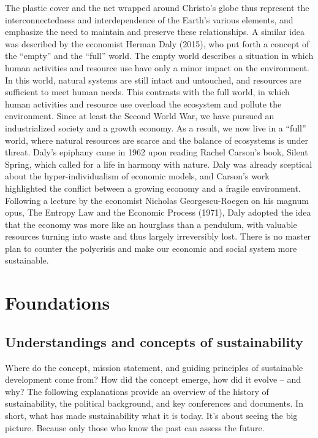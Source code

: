 \documentclass[
  a4paper,
  openany]{book}
\begin{document}
The plastic cover and the net wrapped around Christo's globe thus
represent the interconnectedness and interdependence of the Earth's
various elements, and emphasize the need to maintain and preserve these
relationships. A similar idea was described by the economist Herman Daly
(2015), who put forth a concept of the ``empty'' and the ``full'' world.
The empty world describes a situation in which human activities and
resource use have only a minor impact on the environment. In this world,
natural systems are still intact and untouched, and resources are
sufficient to meet human needs. This contrasts with the full world, in
which human activities and resource use overload the ecosystem and
pollute the environment. Since at least the Second World War, we have
pursued an industrialized society and a growth economy. As a result, we
now live in a ``full'' world, where natural resources are scarce and the
balance of ecosystems is under threat. Daly's epiphany came in 1962 upon
reading Rachel Carson's book, Silent Spring, which called for a life in
harmony with nature. Daly was already sceptical about the
hyper-individualism of economic models, and Carson's work highlighted
the conflict between a growing economy and a fragile environment.
Following a lecture by the economist Nicholas Georgescu-Roegen on his
magnum opus, The Entropy Law and the Economic Process (1971), Daly
adopted the idea that the economy was more like an hourglass than a
pendulum, with valuable resources turning into waste and thus largely
irreversibly lost. There is no master plan to counter the polycrisis and
make our economic and social system more sustainable.

\part{Foundations}

\chapter{Understandings and concepts of
sustainability}\label{understandings-and-concepts-of-sustainability}

Where do the concept, mission statement, and guiding principles of
sustainable development come from? How did the concept emerge, how did
it evolve -- and why? The following explanations provide an overview of
the history of sustainability, the political background, and key
conferences and documents. In short, what has made sustainability what
it is today. It's about seeing the big picture. Because only those who
know the past can assess the future.
\end{document}
